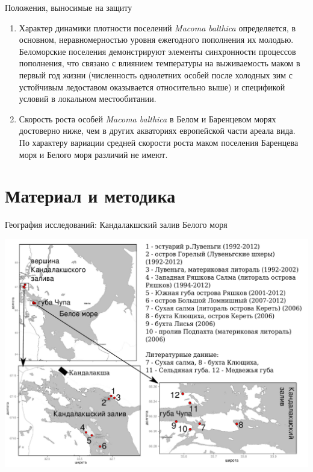 \documentclass{beamer}
\begin{document}
\begin{frame}{Положения, выносимые на защиту}
\begin{enumerate}
\addtocounter{enumi}{2}

\item Характер динамики плотности поселений \textit{Macoma balthica} определяется, в основном, неравномерностью  уровня ежегодного пополнения их молодью. 
Беломорские поселения демонстрируют элементы синхронности процессов пополнения, что связано с влиянием температуры на выживаемость маком в первый год жизни  (численность однолетних особей после холодных зим с устойчивым ледоставом оказывается относительно выше) и спецификой условий в локальном местообитании.

\item Скорость роста особей \textit{Macoma balthica} в Белом и Баренцевом морях достоверно ниже, чем в других акваториях европейской части ареала вида. 
По характеру вариации средней скорости роста маком поселения Баренцева моря и Белого моря различий не имеют. 
\end{enumerate}
\end{frame}

		\section[Методы]{Материал и методика}
\begin{frame}{География исследований: Кандалакшский залив Белого моря}
 \begin{center}
	\includegraphics[height=.8\textheight]{./White_sea.pdf}
 \end{center}
\end{frame}
\end{document}
